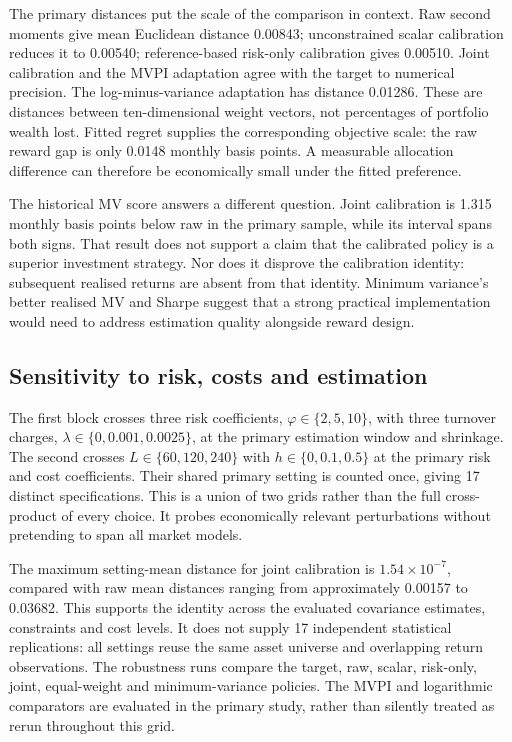 \documentclass[sigconf,review]{acmart}
\begin{document}
The primary distances put the scale of the comparison in context. Raw second moments give mean Euclidean distance 0.00843; unconstrained scalar calibration reduces it to 0.00540; reference-based risk-only calibration gives 0.00510. Joint calibration and the MVPI adaptation agree with the target to numerical precision. The log-minus-variance adaptation has distance 0.01286. These are distances between ten-dimensional weight vectors, not percentages of portfolio wealth lost. Fitted regret supplies the corresponding objective scale: the raw reward gap is only 0.0148 monthly basis points. A measurable allocation difference can therefore be economically small under the fitted preference.

The historical MV score answers a different question. Joint calibration is 1.315 monthly basis points below raw in the primary sample, while its interval spans both signs. That result does not support a claim that the calibrated policy is a superior investment strategy. Nor does it disprove the calibration identity: subsequent realised returns are absent from that identity. Minimum variance's better realised MV and Sharpe suggest that a strong practical implementation would need to address estimation quality alongside reward design.

\subsection{Sensitivity to risk, costs and estimation}
The first block crosses three risk coefficients, $\varphi\in\{2,5,10\}$, with three turnover charges, $\lambda\in\{0,0.001,0.0025\}$, at the primary estimation window and shrinkage. The second crosses $L\in\{60,120,240\}$ with $h\in\{0,0.1,0.5\}$ at the primary risk and cost coefficients. Their shared primary setting is counted once, giving 17 distinct specifications. This is a union of two grids rather than the full cross-product of every choice. It probes economically relevant perturbations without pretending to span all market models.

The maximum setting-mean distance for joint calibration is $1.54\times10^{-7}$, compared with raw mean distances ranging from approximately 0.00157 to 0.03682. This supports the identity across the evaluated covariance estimates, constraints and cost levels. It does not supply 17 independent statistical replications: all settings reuse the same asset universe and overlapping return observations. The robustness runs compare the target, raw, scalar, risk-only, joint, equal-weight and minimum-variance policies. The MVPI and logarithmic comparators are evaluated in the primary study, rather than silently treated as rerun throughout this grid.
\end{document}
